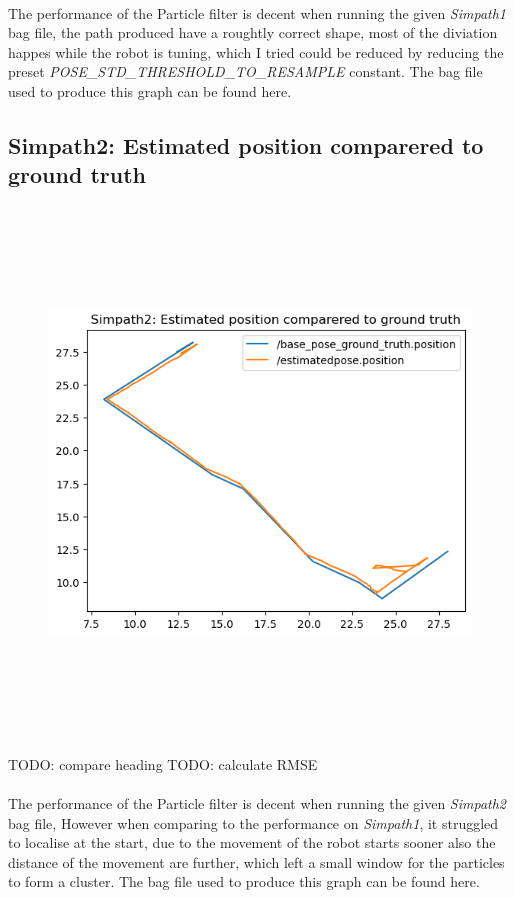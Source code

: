 \documentclass[11pt,a4paper]{article}
\begin{document}
  \paragraph{}
  The performance of the Particle filter is decent when running the given \textit{Simpath1} bag file,
  the path produced have a roughtly correct shape, most of the diviation happes while the robot is tuning,
  which I tried could be reduced by reducing the preset \textit{POSE\_STD\_THRESHOLD\_TO\_RESAMPLE} constant.
  The bag file used to produce this graph can be found here.
  \newpage
  \subsection{Simpath2: Estimated position comparered to ground truth}
  \begin{figure}[h]
  \centering
  \includegraphics[width=14cm, height=14cm]{sim2_paths.png}
  \end{figure}
  TODO: compare heading
  TODO: calculate RMSE
  \paragraph{}
  The performance of the Particle filter is decent when running the given \textit{Simpath2} bag file,
  However when comparing to the performance on \textit{Simpath1}, it struggled to localise at the start,
  due to the movement of the robot starts sooner also the distance of the movement are further, which left a
  small window for the particles to form a cluster. The bag file used to produce this graph can be found here.
\newpage
\end{document}
